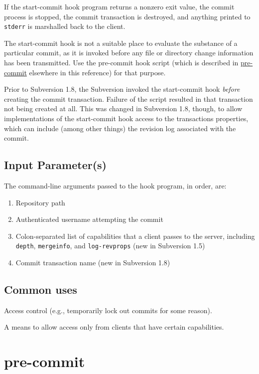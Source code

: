 If the start-commit hook program returns a nonzero exit value, the
commit process is stopped, the commit transaction is destroyed, and
anything printed to \texttt{stderr} is marshalled back to the client.

The start-commit hook is not a suitable place to evaluate the substance
of a particular commit, as it is invoked before any file or directory
change information has been transmitted. Use the pre-commit hook script
(which is described in
\hyperref[svn.ref.reposhooks.pre-commit]{pre-commit} elsewhere in this
reference) for that purpose.

Prior to Subversion 1.8, the Subversion invoked the start-commit hook
\emph{before} creating the commit transaction. Failure of the script
resulted in that transaction not being created at all. This was changed
in Subversion 1.8, though, to allow implementations of the start-commit
hook access to the transaction\textquotesingle s properties, which can
include (among other things) the revision log associated with the
commit.

\subsection{Input Parameter(s)}

The command-line arguments passed to the hook program, in order, are:

\begin{enumerate}
\def\labelenumi{\arabic{enumi}.}
\item
  Repository path
\item
  Authenticated username attempting the commit
\item
  Colon-separated list of capabilities that a client passes to the
  server, including \texttt{depth}, \texttt{mergeinfo}, and
  \texttt{log-revprops} (new in Subversion 1.5)
\item
  Commit transaction name (new in Subversion 1.8)
\end{enumerate}

\subsection{Common uses}

Access control (e.g., temporarily lock out commits for some reason).

A means to allow access only from clients that have certain
capabilities.

\section{pre-commit}\label{svn.ref.reposhooks.pre-commit}

